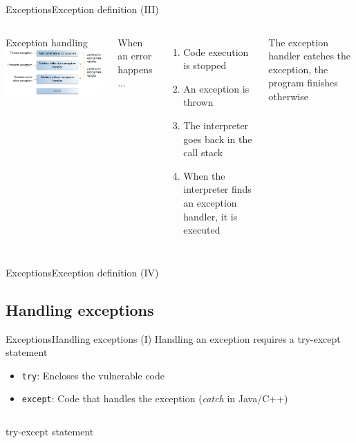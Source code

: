 \documentclass[10pt,compress]{beamer} %
\begin{document}
\begin{frame}{Exceptions}{Exception definition (III)}
    \begin{columns}
		\centering Exception handling
		\includegraphics[width=0.8\linewidth]{figs/exceptions-errorOccurs.png}

		When an error happens ...
		\begin{enumerate}
		\item Code execution is stopped
		\item An exception is thrown
		\item The interpreter goes back in the call stack
		\item When the interpreter finds an exception handler, it is executed
		\end{enumerate}
		The exception handler catches the exception, the program finishes otherwise
	\end{columns}
\end{frame}

\begin{frame}{Exceptions}{Exception definition (IV)}
	
\end{frame}

\subsection{Handling exceptions}
\begin{frame}{Exceptions}{Handling exceptions (I)}
	Handling an exception requires a try-except statement
	\begin{itemize}
		\item \texttt{try}: Encloses the vulnerable code
		\item \texttt{except}: Code that handles the exception (\textit{catch} in Java/C++)
	\end{itemize}

    \begin{columns}
	\begin{block}{try-except statement}
	\vspace{-0.2cm}
		
	\vspace{-0.2cm}
	\end{block}
	\end{columns}
\end{frame}
\end{document}
